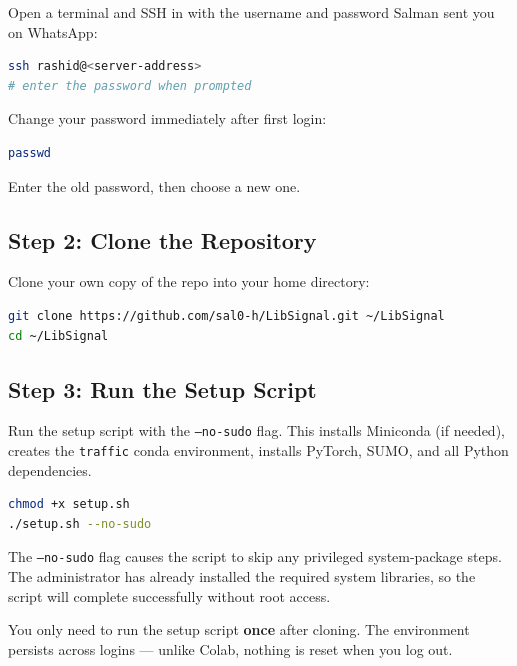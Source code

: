 \documentclass[11pt,a4paper]{article}
\begin{document}
Open a terminal and SSH in with the username and password Salman sent you on WhatsApp:

\begin{lstlisting}[language=bash]
ssh rashid@<server-address>
# enter the password when prompted
\end{lstlisting}

\begin{warningbox}
Change your password immediately after first login:
\begin{lstlisting}[language=bash]
passwd
\end{lstlisting}
Enter the old password, then choose a new one.
\end{warningbox}

\subsection{Step 2: Clone the Repository}

Clone your own copy of the repo into your home directory:

\begin{lstlisting}[language=bash]
git clone https://github.com/sal0-h/LibSignal.git ~/LibSignal
cd ~/LibSignal
\end{lstlisting}

\subsection{Step 3: Run the Setup Script}

Run the setup script with the \texttt{--no-sudo} flag.
This installs Miniconda (if needed), creates the \texttt{traffic} conda environment, installs PyTorch, SUMO, and all Python dependencies.

\begin{lstlisting}[language=bash]
chmod +x setup.sh
./setup.sh --no-sudo
\end{lstlisting}

The \texttt{--no-sudo} flag causes the script to skip any privileged system-package steps.
The administrator has already installed the required system libraries, so the script will complete successfully without root access.

\begin{infobox}
You only need to run the setup script \textbf{once} after cloning.
The environment persists across logins --- unlike Colab, nothing is reset when you log out.
\end{infobox}
\end{document}
